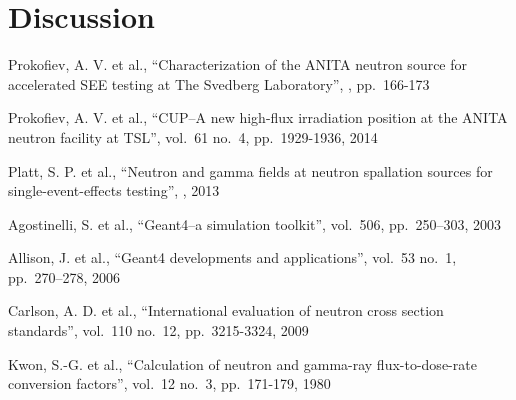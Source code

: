 \documentclass[11pt,a4paper]{IEEEtran}
\begin{document}
\section{Discussion}

\begin{thebibliography}{99} %

Prokofiev, A. V. et al.,
\newblock ``Characterization of the ANITA neutron source for accelerated SEE testing at The Svedberg Laboratory'',
, pp.~166-173

Prokofiev, A. V. et al.,
\newblock ``CUP--A new high-flux irradiation position at the ANITA neutron facility at TSL'',		 vol.~61 no.~4, pp.~1929-1936, 2014

Platt, S. P. et al.,
\newblock ``Neutron and gamma fields at neutron spallation sources for single-event-effects testing'',
, 2013

Agostinelli, S. et al.,
\newblock``Geant4--a simulation toolkit'',
 vol.~506, pp.~250--303, 2003

Allison, J. et al.,
\newblock ``Geant4 developments and applications'',
 vol.~53 no.~1, pp.~270--278, 2006

Carlson, A. D. et al.,
\newblock ``International evaluation of neutron cross section standards'',
 vol.~110 no.~12, pp.~3215-3324, 2009

Kwon, S.-G. et al.,
\newblock ``Calculation of neutron and gamma-ray flux-to-dose-rate conversion factors'',
 vol.~12 no.~3, pp.~171-179, 1980

\end{thebibliography}

\cleardoublepage

\todos
\end{document}
